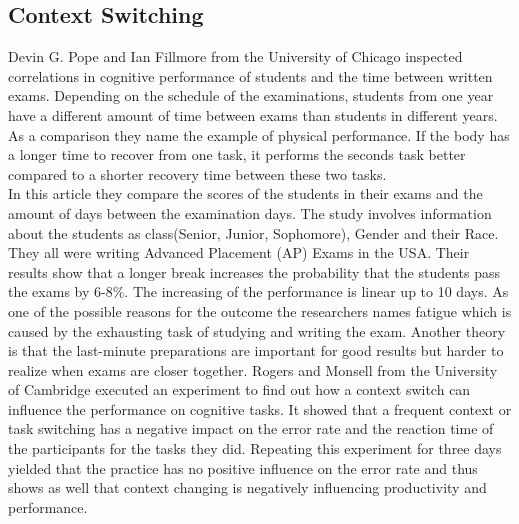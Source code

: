 \subsection{Context Switching}
Devin G. Pope and Ian Fillmore from the University of Chicago \cite{pope2015impact} inspected correlations in cognitive performance of students and the time between written exams. 
Depending on the schedule of the examinations, students from one year have a different amount of time between exams than students in different years.
As a comparison they name the example of physical performance. If the body has a longer time to recover from one task, it performs the seconds task better compared to a shorter recovery time between these two tasks.\\ 
In this article they compare the scores of the students in their exams and the amount of days between the examination days. 
The study involves information about the students as class(Senior, Junior, Sophomore), Gender and their Race. They all were writing Advanced Placement (AP) Exams in the USA. 
Their results show that a longer break increases the probability that the students pass the exams by 6-8\%. The increasing of the performance is linear up to 10 days.
\bigbreak
As one of the possible reasons for the outcome the researchers names fatigue which is caused by the exhausting task of studying and writing the exam. Another theory is that the last-minute preparations are important for good results but harder to realize when exams are closer together. 
Rogers and Monsell from the University of Cambridge \cite{rogers1995costs} executed an experiment to find out how a context switch can influence the performance on cognitive tasks. It showed that a frequent context or task switching has a negative impact on the error rate and the reaction time of the participants for the tasks they did. Repeating this experiment for three days yielded that the practice has no positive influence on the error rate and thus shows as well that context changing is negatively influencing productivity and performance. 


